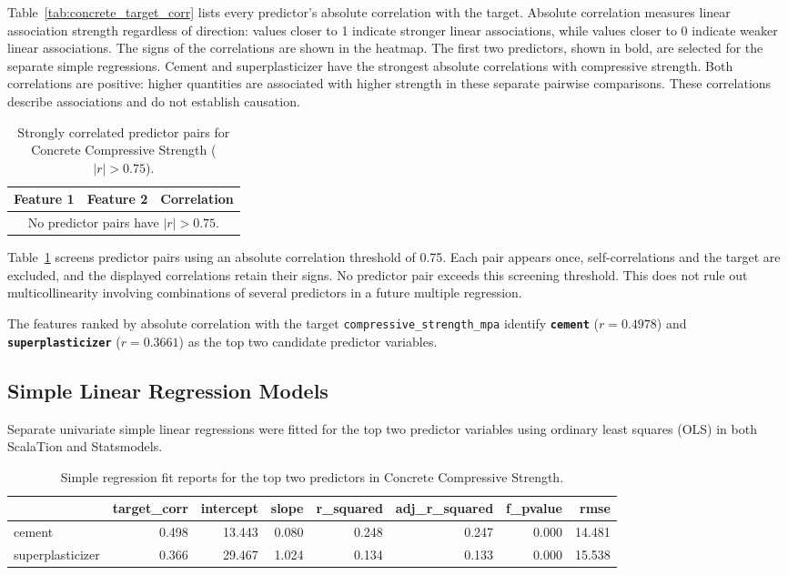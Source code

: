 \documentclass[11pt]{article}
\begin{document}
Table~\ref{tab:concrete_target_corr} lists every predictor's absolute correlation with the target. Absolute correlation measures linear association strength regardless of direction: values closer to 1 indicate stronger linear associations, while values closer to 0 indicate weaker linear associations. The signs of the correlations are shown in the heatmap. The first two predictors, shown in bold, are selected for the separate simple regressions. Cement and superplasticizer have the strongest absolute correlations with compressive strength. Both correlations are positive: higher quantities are associated with higher strength in these separate pairwise comparisons. These correlations describe associations and do not establish causation.

\begin{table}[H]
\centering
\small
\begin{tabular}{llr}
\toprule
Feature 1 & Feature 2 & Correlation \\
\midrule
\multicolumn{3}{c}{No predictor pairs have $|r| > 0.75$.} \\
\bottomrule
\end{tabular}
\caption{Strongly correlated predictor pairs for Concrete Compressive Strength ($|r| > 0.75$).}
\label{tab:concrete_predictor_pairs}
\end{table}

Table~\ref{tab:concrete_predictor_pairs} screens predictor pairs using an absolute correlation threshold of 0.75. Each pair appears once, self-correlations and the target are excluded, and the displayed correlations retain their signs. No predictor pair exceeds this screening threshold. This does not rule out multicollinearity involving combinations of several predictors in a future multiple regression.

The features ranked by absolute correlation with the target \texttt{compressive\_strength\_mpa} identify \textbf{\texttt{cement}} ($r = 0.4978$) and \textbf{\texttt{superplasticizer}} ($r = 0.3661$) as the top two candidate predictor variables.

\subsection{Simple Linear Regression Models}
Separate univariate simple linear regressions were fitted for the top two predictor variables using ordinary least squares (OLS) in both ScalaTion and Statsmodels.

\begin{table}[H]
\centering
\small
\begin{tabular}{lrrrrrrr}
\toprule
 & target\_corr & intercept & slope & r\_squared & adj\_r\_squared & f\_pvalue & rmse \\
\midrule
cement & 0.498 & 13.443 & 0.080 & 0.248 & 0.247 & 0.000 & 14.481 \\
superplasticizer & 0.366 & 29.467 & 1.024 & 0.134 & 0.133 & 0.000 & 15.538 \\
\bottomrule
\end{tabular}

\caption{Simple regression fit reports for the top two predictors in Concrete Compressive Strength.}
\label{tab:concrete_reg}
\end{table}
\end{document}
